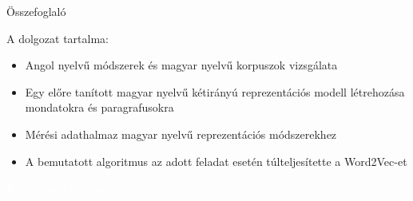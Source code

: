\documentclass{beamer}
\begin{document}
\begin{frame}{Összefoglaló}
	
A dolgozat tartalma:
	
\begin{itemize}
	\item Angol nyelvű módszerek és magyar nyelvű korpuszok vizsgálata
	\item Egy előre tanított magyar nyelvű kétirányú reprezentációs modell létrehozása mondatokra és paragrafusokra
	\item Mérési adathalmaz magyar nyelvű reprezentációs módszerekhez
	\item A bemutatott algoritmus az adott feladat esetén túlteljesítette a Word2Vec-et
\end{itemize}
	
\end{frame}



	





{
	\begin{frame}[plain]
		\begin{center}
			\textcolor{white}{\Huge{Köszönöm a figyelmet!}}
		\end{center}
	\end{frame}
}



	
\end{document}
